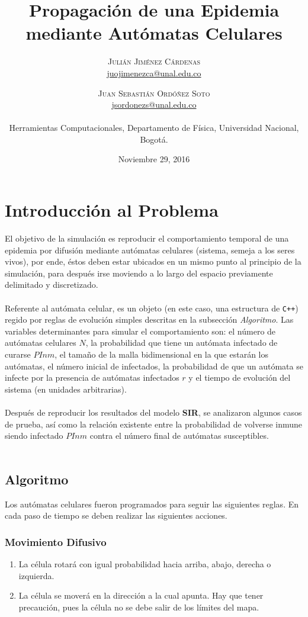 \documentclass[twoside,twocolumn]{article}
\title{Propagación de una Epidemia mediante Autómatas Celulares} %
\author{%
\textsc{Julián Jiménez Cárdenas} \\[1ex] %
\normalsize \href{mailto:juojimenezca@unal.edu.co}{juojimenezca@unal.edu.co} %
\and %
\textsc{Juan Sebastián Ordóñez Soto} \\[1ex]
\normalsize \href{mailto:jsordonezs@unal.edu.co}{jsordonezs@unal.edu.co} 
\\ \\ \normalsize{Herramientas Computacionales, Departamento de Física, Universidad Nacional, Bogotá.} %
}
\date{\normalsize{Noviembre 29, 2016}} %
\newcommand{\code}[1]{\colorbox{light-gray}{\texttt{#1}}}
\begin{document}
\maketitle
\section{Introducción al Problema}
El objetivo de la simulación es reproducir el comportamiento temporal de una epidemia por difusión mediante autómatas celulares (sistema, semeja a los seres vivos), por ende, éstos deben estar ubicados en un mismo punto al principio de la simulación, para después irse moviendo a lo largo del espacio previamente delimitado y discretizado.\\ \\
Referente al autómata celular, es un objeto (en este caso, una estructura de \code{C++}) regido por reglas de evolución simples descritas en la subsección \textit{Algoritmo}. Las variables determinantes para simular el comportamiento son: el número de autómatas celulares $N$, la probabilidad que tiene un autómata infectado de curarse $PInm$, el tamaño de la malla bidimensional en la que estarán los autómatas, el número inicial de infectados, la probabilidad de que un autómata se infecte por la presencia de autómatas infectados $r$ y el tiempo de evolución del sistema (en unidades arbitrarias).\\ \\
Después de reproducir los resultados del modelo \textbf{SIR}, se analizaron algunos casos de prueba, así como la relación existente entre la probabilidad de volverse inmune siendo infectado $PInm$ contra el número final de autómatas susceptibles.\\ \\
\subsection{Algoritmo}
Los autómatas celulares fueron programados para seguir las siguientes reglas. En cada paso de tiempo se deben realizar las siguientes acciones.
\subsubsection{Movimiento Difusivo}
\begin{enumerate}
\item La célula rotará con igual probabilidad hacia arriba, abajo, derecha o izquierda.
\item La célula se moverá en la dirección a la cual apunta. Hay que tener precaución, pues la célula no se debe salir de los límites del mapa.
\end{enumerate}
\end{document}
